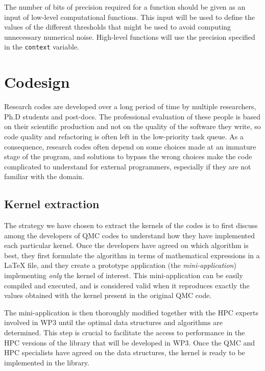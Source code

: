 The number of bits of precision  required for a function should be
given as an input of low-level computational functions. This input
will be used to define the values of the different thresholds that
might be used to avoid computing unnecessary numerical
noise. High-level functions will use the precision specified in the
\texttt{context} variable.


\section{Codesign}
\label{sec:codesign}

Research codes are developed over a long period of time by multiple
researchers, Ph.D students and post-docs. The professional evaluation
of these people is based on their scientific production and not on the
quality of the software they write, so code quality and refactoring is
often left in the low-priority task queue. As a consequence, research
codes often depend on some choices made at an immature stage of the
program, and solutions to bypass the wrong choices make the code
complicated to understand for external programmers, especially if they
are not familiar with the domain.

\subsection{Kernel extraction}

The strategy we have chosen to extract the kernels of the codes is to
first discuss among the developers of \ac{QMC} codes to understand how they have
implemented each particular kernel. Once the developers have agreed on
which algorithm is best, they first formulate the algorithm in terms
of mathematical expressions in a {\LaTeX} file, and they create a prototype application 
(the \emph{mini-application}) implementing \emph{only} the kernel of
interest. This mini-application can be easily compiled and executed,
and is considered valid when it reproduces exactly the values obtained
with the kernel present in the original \ac{QMC} code.

The mini-application is then thoroughly modified together with the
\ac{HPC} experts involved in \ac{WP}3 until the optimal data
structures and algorithms are determined. This step is crucial to
facilitate the access to performance in the \ac{HPC} versions of the
library that will be developed in \ac{WP}3.  Once the \ac{QMC} and
\ac{HPC} specialists have agreed on the data structures, the kernel is
ready to be implemented in the
library.


